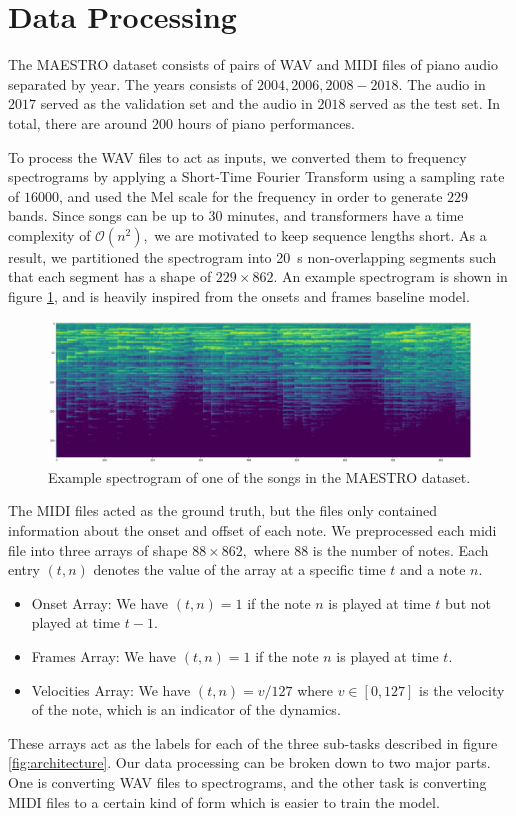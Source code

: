 \documentclass[a4paper,twocolumn,10pt]{article}
\begin{document}
\section{Data Processing}
The MAESTRO dataset consists of pairs of WAV and MIDI files of piano audio separated by year. The years consists of $2004,2006,2008-2018.$ The audio in $2017$ served as the validation set and the audio in $2018$ served as the test set. In total, there are around $200$ hours of piano performances.

To process the WAV files to act as inputs, we converted them to frequency spectrograms by applying a Short-Time Fourier Transform using a sampling rate of $16000$, and used the Mel scale for the frequency in order to generate $229$ bands. Since songs can be up to $30$ minutes, and transformers have a time complexity of $\mathcal{O}(n^2),$ we are motivated to keep sequence lengths short. As a result, we partitioned the spectrogram into \SI{20}{s} non-overlapping segments such that each segment has a shape of $229 \times 862.$ An example spectrogram is shown in figure \ref{fig:spectrogram}, and is heavily inspired from the onsets and frames baseline model\cite{onsets_and_frames}.

\begin{figure}[h!]
  \centering
  \includegraphics[width=\linewidth]{figures/spectrogram.png}
  \caption{Example spectrogram of one of the songs in the MAESTRO dataset.}
  \label{fig:spectrogram}
\end{figure}

The MIDI files acted as the ground truth, but the files only contained information about the onset and offset of each note. We preprocessed each midi file into three arrays of shape $88 \times 862,$ where $88$ is the number of notes. Each entry $(t,n)$ denotes the value of the array at a specific time $t$ and a note $n$.
\begin{itemize}
  \item Onset Array: We have $(t,n)=1$ if the note $n$ is played at time $t$ but not played at time $t-1.$
  \item Frames Array: We have $(t,n)=1$ if the note $n$ is played at time $t$.
  \item Velocities Array: We have $(t,n)=v/127$ where $v \in [0,127]$ is the velocity of the note, which is an indicator of the dynamics.
\end{itemize}
These arrays act as the labels for each of the three sub-tasks described in figure \ref{fig:architecture}.
Our data processing can be broken down to two major parts. One is converting WAV files to spectrograms, and the other task is converting MIDI files to a certain kind of form which is easier to train the model.
\end{document}
